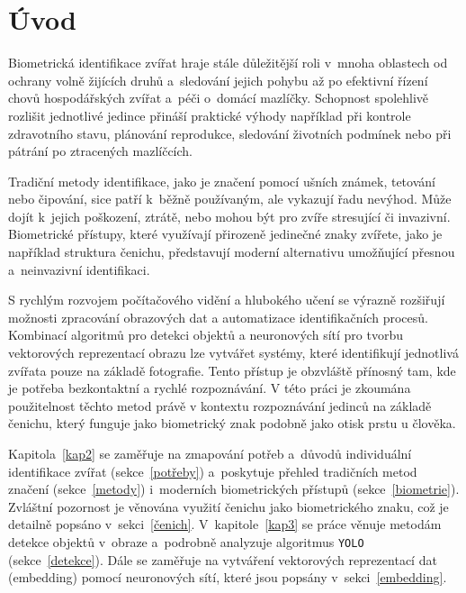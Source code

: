 
%

\chapter{Úvod}
Biometrická identifikace zvířat hraje stále důležitější roli v~mnoha oblastech od ochrany volně žijících druhů a~sledování jejich pohybu až po efektivní řízení chovů hospodářských zvířat a~péči o~domácí mazlíčky. Schopnost spolehlivě rozlišit jednotlivé jedince přináší praktické výhody například při kontrole zdravotního stavu, plánování reprodukce, sledování životních podmínek nebo při pátrání po ztracených mazlíčcích.

Tradiční metody identifikace, jako je značení pomocí ušních známek, tetování nebo čipování, sice patří k~běžně používaným, ale vykazují řadu nevýhod. Může dojít k~jejich poškození, ztrátě, nebo mohou být pro zvíře stresující či invazivní. Biometrické přístupy, které využívají přirozeně jedinečné znaky zvířete, jako je například struktura čenichu, představují moderní alternativu umožňující přesnou a~neinvazivní identifikaci.

S rychlým rozvojem počítačového vidění a hlubokého učení se výrazně rozšiřují možnosti zpracování obrazových dat a automatizace identifikačních procesů. Kombinací algoritmů pro detekci objektů a neuronových sítí pro tvorbu vektorových reprezentací obrazu lze vytvářet systémy, které identifikují jednotlivá zvířata pouze na základě fotografie. Tento přístup je obzvláště přínosný tam, kde je potřeba bezkontaktní a rychlé rozpoznávání. V této práci je zkoumána použitelnost těchto metod právě v kontextu rozpoznávání jedinců na základě čenichu, který funguje jako biometrický znak podobně jako otisk prstu u člověka.

Kapitola~\ref{kap2} se zaměřuje na zmapování potřeb a~důvodů individuální identifikace zvířat (sekce~\ref{potřeby}) a~poskytuje přehled tradičních metod značení (sekce~\ref{metody}) i~moderních biometrických přístupů (sekce~\ref{biometrie}). Zvláštní pozornost je věnována využití čenichu jako biometrického znaku, což je detailně popsáno v~sekci~\ref{čenich}. V~kapitole~\ref{kap3} se práce věnuje metodám detekce objektů v~obraze a~podrobně analyzuje algoritmus \texttt{YOLO} (sekce~\ref{detekce}). Dále se zaměřuje na vytváření vektorových reprezentací dat (embedding) pomocí neuronových sítí, které jsou popsány v~sekci~\ref{embedding}.

